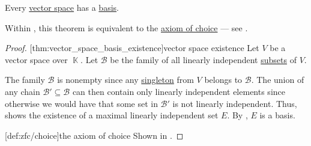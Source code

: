 \begin{theorem}\label{thm:vector_space_basis_existence}
  Every \hyperref[def:vector_space]{vector space} has a \hyperref[def:hamel_basis]{basis}.
\end{theorem}
\begin{comments}
  \item Within \hyperref[def:zfc]{}, this theorem is equivalent to the \hyperref[def:zfc/choice]{axiom of choice} --- see .
\end{comments}
\begin{proof}
  [thm:vector_space_basis_existence]{vector space existence} Let \( V \) be a vector space over \( \BbbK \). Let \( \mathcal{B} \) be the family of all linearly independent \hyperref[rem:linear_combinations]{subsets} of \( V \).

  The family \( \mathcal{B} \) is nonempty since any \hyperref[rem:singleton_sets]{singleton} from \( V \) belongs to \( \mathcal{B} \). The union of any chain \( \mathcal{B}' \subseteq \mathcal{B} \) can then contain only linearly independent elements since otherwise we would have that some set in \( \mathcal{B}' \) is not linearly independent. Thus,  shows the existence of a maximal linearly independent set \( E \). By , \( E \) is a basis.

  [def:zfc/choice]{the axiom of choice} Shown in \cite{Blass1984}.
\end{proof}

